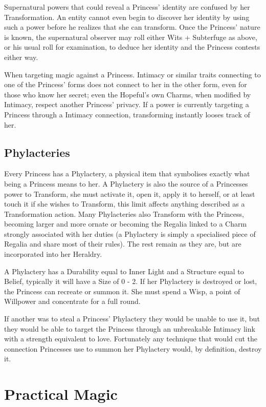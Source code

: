 Supernatural powers that could reveal a Princess' identity are confused by her Transformation. An entity cannot even begin to discover her identity by using such a power before he realizes that she can transform. Once the Princess' nature is known, the supernatural observer may roll either Wits + Subterfuge as above, or his usual roll for examination, to deduce her identity and the Princess contests either way. 

When targeting magic against a Princess. Intimacy or similar traits connecting to one of the Princess' forms does not connect to her in the other form, even for those who know her secret; even the Hopeful's own Charms, when modified by Intimacy, respect another Princess' privacy. If a power is currently targeting a Princess through a Intimacy connection, transforming instantly looses track of her. 


\subsection*{Phylacteries}

Every Princess has a Phylactery, a physical item that symbolises exactly what being a Princess means to her. A Phylactery is also the source of a Princesses power to Transform, she must activate it, open it, apply it to herself, or at least touch it if she wishes to Transform, this limit affects anything described as a Transformation action. Many Phylacteries also Transform with the Princess, becoming larger and more ornate or becoming the Regalia linked to a Charm strongly associated with her duties (a Phylactery is simply a specialised piece of Regalia and share most of their rules). The rest remain as they are, but are incorporated into her Heraldry. 

A Phylactery has a Durability equal to Inner Light and a Structure equal to Belief, typically it will have a Size of 0 - 2. If her Phylactery is destroyed or lost, the Princess can recreate or summon it. She must spend a Wisp, a point of Willpower and concentrate for a full round. 

If another was to steal a Princess' Phylactery they would be unable to use it, but they would be able to target the Princess through an unbreakable Intimacy link with a strength equivalent to love. Fortunately any technique that would cut the connection Princesses use to summon her Phylactery would, by definition, destroy it.

\section*{Practical Magic}

